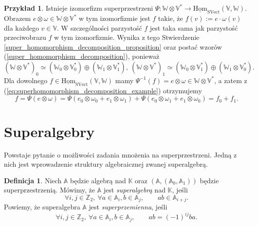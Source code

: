 \documentclass[11pt,a4paper]{report}
\theoremstyle{definition}
\newtheorem{example}[theorem]{Przykład}
\newtheorem{definition}[theorem]{Definicja}
\begin{document}
\begin{example}
	Istnieje izomorfizm superprzestrzeni $\Psi: \mathbb{W} \otimes \mathbb{V}^* \rightarrow \underline{\mathrm{Hom}}_{\mathrm{SVect}}(\mathbb{V},\mathbb{W})$. Obrazem $e \otimes \omega \in \mathbb{W} \otimes \mathbb{V}^*$ w tym izomorfizmie jest $f$ takie, że $f(v) := e \cdot \omega(v)$ dla każdego $v \in \mathbb{V}$. W szczególności parzystość $f$ jest taka sama jak parzystość przeciwobrazu $f$ w tym izomorfizmie. Wynika z tego Stwierdzenie \ref{super_homomorphism_decomposition_proposition} oraz postać wzorów (\ref{super_homomorphism_decomposition}), ponieważ
	\begin{equation}
		\label{eq:superhomomorphism_decomposition_example}
		(\mathbb{W} \otimes \mathbb{V}^{*})_0 \simeq (\mathbb{W}_0 \otimes \mathbb{V}_0^{*}) \oplus (\mathbb{W}_1 \otimes \mathbb{V}_1^{*}),\ (\mathbb{W} \otimes \mathbb{V}^{*})_1 \simeq (\mathbb{W}_0 \otimes \mathbb{V}_1^{*}) \oplus (\mathbb{W}_1 \otimes \mathbb{V}_0^{*}).
	\end{equation}
	Dla dowolnego $f \in \underline{\mathrm{Hom}}_{\mathrm{SVect}}(\mathbb{V},\mathbb{W})$ mamy $\Psi^{-1}(f) = e\otimes \omega \in \mathbb{W} \otimes \mathbb{V}^*$, a zatem z (\ref{eq:superhomomorphism_decomposition_example}) otrzymujemy $$f = \Psi(e \otimes \omega) = \Psi (e_0 \otimes \omega_0 + e_1 \otimes \omega_1) + \Psi (e_0 \otimes \omega_1 + e_1 \otimes \omega_0) = f_0 + f_1.$$
				
\end{example}

\section{Superalgebry}

Powstaje pytanie o możliwości zadania mnożenia na superprzestrzeni. Jedną z nich jest wprowadzenie struktury algebraicznej zwanej superalgebrą.

\begin{definition}
	\label{def:superalgebra}
	Niech $\mathbb{A}$ będzie algebrą nad $\mathbb{K}$ oraz $(\mathbb{A}, (\mathbb{A}_0, \mathbb{A}_1))$ będzie superprzestrzenią. Mówimy, że $\mathbb{A}$ jest \textit{superalgebrą} nad  $\mathbb{K}$, jeśli
	\begin{equation*}
		\forall i,j \in \mathbb{Z}_2,\ \forall a \in \mathbb{A}_i, b \in \mathbb{A}_j, \qquad ab \in \mathbb{A}_{i+j}.
	\end{equation*}
	Powiemy, że superalgebra $\mathbb{A}$ jest \textit{superprzemienna}, jeśli
	\begin{equation*}
		\forall i,j \in \mathbb{Z}_2,\ \forall a \in \mathbb{A}_i, b \in \mathbb{A}_j, \qquad ab = (-1)^{ij} ba.
	\end{equation*}
\end{definition}
\end{document}
